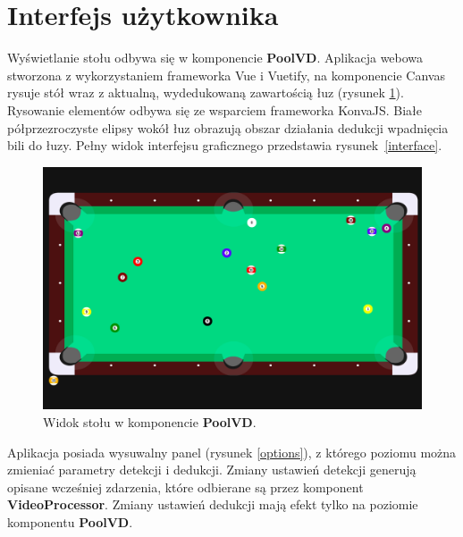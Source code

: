 \documentclass[12pt]{article}
\begin{document}
\section{Interfejs użytkownika}

Wyświetlanie stołu odbywa się w komponencie \textbf{PoolVD}. Aplikacja webowa stworzona z wykorzystaniem frameworka Vue i Vuetify, na komponencie Canvas rysuje stół wraz z aktualną, wydedukowaną zawartością łuz (rysunek \ref{pool1}). Rysowanie elementów odbywa się ze wsparciem frameworka KonvaJS\cite{konva}. Białe półprzezroczyste elipsy wokół łuz obrazują obszar działania dedukcji wpadnięcia bili do łuzy. Pełny widok interfejsu graficznego przedstawia rysunek~\ref{interface}.

\begin{figure}[!htb]
    \centering
    \includegraphics[width=15cm]{./images/pool1.png}
    \caption{Widok stołu w komponencie \textbf{PoolVD}.}
    \label{pool1}
\end{figure}

Aplikacja posiada wysuwalny panel (rysunek \ref{options}), z którego poziomu można zmieniać parametry detekcji i dedukcji. Zmiany ustawień detekcji generują opisane wcześniej zdarzenia, które odbierane są przez komponent \textbf{VideoProcessor}. Zmiany ustawień dedukcji mają efekt tylko na poziomie komponentu \textbf{PoolVD}.
\end{document}
